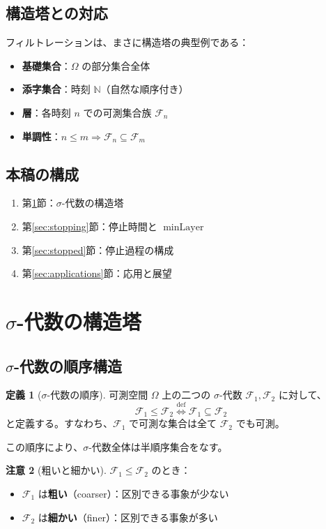 \documentclass[12pt,a4paper]{article}
\theoremstyle{definition}
\newtheorem{definition}{定義}[section]
\newtheorem{remark}[definition]{注意}
\newcommand{\N}{\mathbb{N}}
\newcommand{\cF}{\mathcal{F}}
\DeclareMathOperator{\minLayer}{minLayer}
\begin{document}
\subsection{構造塔との対応}

フィルトレーションは、まさに構造塔の典型例である：

\begin{itemize}
\item \textbf{基礎集合}：$\Omega$ の部分集合全体
\item \textbf{添字集合}：時刻 $\N$（自然な順序付き）
\item \textbf{層}：各時刻 $n$ での可測集合族 $\cF_n$
\item \textbf{単調性}：$n \leq m \Rightarrow \cF_n \subseteq \cF_m$
\end{itemize}

\subsection{本稿の構成}

\begin{enumerate}
\item 第\ref{sec:sigma}節：$\sigma$-代数の構造塔
\item 第\ref{sec:stopping}節：停止時間と $\minLayer$
\item 第\ref{sec:stopped}節：停止過程の構成
\item 第\ref{sec:applications}節：応用と展望
\end{enumerate}

\section{$\sigma$-代数の構造塔}\label{sec:sigma}

\subsection{$\sigma$-代数の順序構造}

\begin{definition}[$\sigma$-代数の順序]
可測空間 $\Omega$ 上の二つの $\sigma$-代数 $\cF_1, \cF_2$ に対して、
\[
\cF_1 \leq \cF_2 \overset{\text{def}}{\Longleftrightarrow} \cF_1 \subseteq \cF_2
\]
と定義する。すなわち、$\cF_1$ で可測な集合は全て $\cF_2$ でも可測。
\end{definition}

この順序により、$\sigma$-代数全体は半順序集合をなす。

\begin{remark}[粗いと細かい]
$\cF_1 \leq \cF_2$ のとき：
\begin{itemize}
\item $\cF_1$ は\textbf{粗い}（coarser）：区別できる事象が少ない
\item $\cF_2$ は\textbf{細かい}（finer）：区別できる事象が多い
\end{itemize}
\end{remark}
\end{document}
